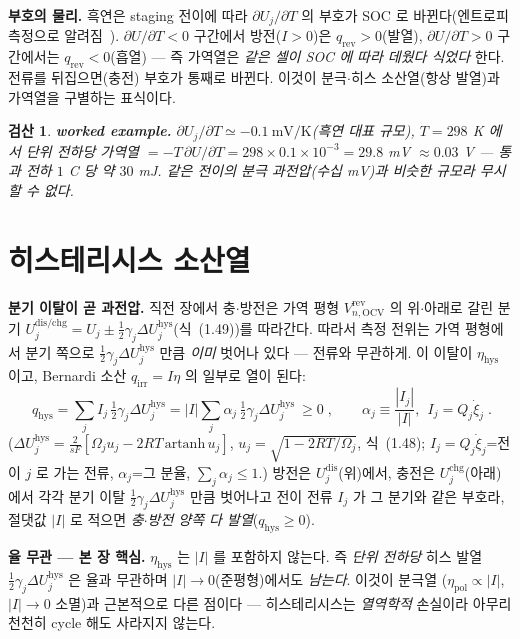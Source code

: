 \documentclass[11pt,a4paper]{article}
\newtheorem*{verifybox}{검산}
\newcommand{\OCV}{\mathrm{OCV}}
\newcommand{\dis}{\mathrm{dis}}
\newcommand{\chg}{\mathrm{chg}}
\newcommand{\hys}{\mathrm{hys}}
\newcommand{\pol}{\mathrm{pol}}
\newcommand{\rev}{\mathrm{rev}}
\newcommand{\irr}{\mathrm{irr}}
\begin{document}
\textbf{부호의 물리.} 흑연은 staging 전이에 따라 $\partial U_j/\partial T$ 의 부호가 SOC 로 바뀐다(엔트로피 측정으로
알려짐~\cite{reynier2004}). $\partial U/\partial T<0$ 구간에서 방전($I>0$)은 $q_\rev>0$(발열), $\partial
U/\partial T>0$ 구간에서는 $q_\rev<0$(흡열) — 즉 가역열은 \emph{같은 셀이 SOC 에 따라 데웠다 식었다} 한다.
전류를 뒤집으면(충전) 부호가 통째로 바뀐다. 이것이 분극$\cdot$히스 소산열(항상 발열)과 가역열을 구별하는
표식이다.
\begin{verifybox}
\textbf{worked example.} $\partial U_j/\partial T\simeq-0.1\ \mathrm{mV/K}$(흑연 대표 규모), $T=298$ K 에서 단위
전하당 가역열 $=-T\,\partial U/\partial T=298\times0.1\times10^{-3}=29.8$ mV $\approx0.03$ V — 통과 전하 $1$ C 당
약 $30$ mJ. 같은 전이의 분극 과전압(수십 mV)과 비슷한 규모라 \emph{무시할 수 없다}.
\end{verifybox}

\section{히스테리시스 소산열}\label{sec:h_hys}
\textbf{분기 이탈이 곧 과전압.} 직전 장에서 충$\cdot$방전은 가역 평형 $V_{n,\OCV}^\rev$ 의 위$\cdot$아래로 갈린
분기 $U_j^{\dis/\chg}=U_j\pm\tfrac12\gamma_j\Delta U_j^\hys$(식~(1.49))를 따라간다. 따라서 측정 전위는 가역 평형에서
분기 쪽으로 $\tfrac12\gamma_j\Delta U_j^\hys$ 만큼 \emph{이미} 벗어나 있다 — 전류와 무관하게. 이 이탈이
$\eta_\hys$ 이고, Bernardi 소산 $q_\irr=I\eta$ 의 일부로 열이 된다:
\begin{equation}
\boxed{\;q_\hys=\sum_j I_j\,\tfrac12\gamma_j\Delta U_j^\hys=|I|\sum_j\alpha_j\,\tfrac12\gamma_j\Delta U_j^\hys\ \ge0\;,\qquad
\alpha_j\equiv\frac{|I_j|}{|I|},\ \ I_j=Q_j\dot\xi_j\;.}
\label{eq:h_qhys}
\end{equation}
($\Delta U_j^\hys=\tfrac{2}{sF}[\Omega_j u_j-2RT\,\mathrm{artanh}\,u_j]$, $u_j=\sqrt{1-2RT/\Omega_j}$, 식~(1.48);
$I_j=Q_j\dot\xi_j$=전이 $j$ 로 가는 전류, $\alpha_j$=그 분율, $\sum_j\alpha_j\le1$.) 방전은 $U_j^\dis$(위)에서,
충전은 $U_j^\chg$(아래)에서 각각 분기 이탈 $\tfrac12\gamma_j\Delta U_j^\hys$ 만큼 벗어나고 전이 전류 $I_j$ 가 그
분기와 같은 부호라, 절댓값 $|I|$ 로 적으면 \emph{충$\cdot$방전 양쪽 다 발열}($q_\hys\ge0$).

\textbf{율 무관 — 본 장 핵심.} $\eta_\hys$ 는 $|I|$ 를 포함하지 않는다. 즉 \emph{단위 전하당} 히스 발열
$\tfrac12\gamma_j\Delta U_j^\hys$ 은 율과 무관하며 $|I|\to0$(준평형)에서도 \emph{남는다}. 이것이 분극열
($\eta_\pol\propto|I|$, $|I|\to0$ 소멸)과 근본적으로 다른 점이다 — 히스테리시스는 \emph{열역학적} 손실이라 아무리
천천히 cycle 해도 사라지지 않는다.
\end{document}
